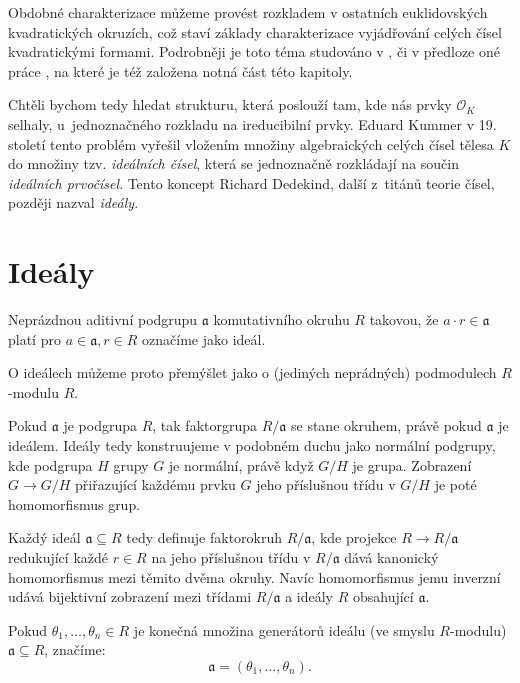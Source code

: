 \documentclass[12pt]{report}
\begin{document}
Obdobné charakterizace můžeme provést rozkladem v ostatních euklidovských kvadratických okruzích, což staví základy charakterizace vyjádřování celých čísel kvadratickými formami. Podrobněji je toto téma studováno v \cite{Tomas}, či v předloze oné práce \cite{Cox}, na které je též založena notná část této kapitoly.

 Chtěli bychom tedy hledat strukturu, která poslouží tam, kde nás prvky $\mathcal{O}_K$ selhaly, u~jednoznačného rozkladu na ireducibilní prvky. Eduard Kummer v 19. století tento problém vyřešil vložením množiny algebraických celých čísel tělesa $K$ do množiny tzv. \textit{ideálních čísel}, která se jednoznačně rozkládají na součin \textit{ideálních prvočísel}. Tento koncept Richard Dedekind, další z~titánů teorie čísel, později nazval \textit{ideály}.

\section{Ideály}

\begin{definice}
Neprázdnou aditivní podgrupu $\mathfrak{a}$ komutativního okruhu $R$ takovou, že $a \cdot r \in \mathfrak{a}$ platí pro $a \in \mathfrak{a}, r \in R$ označíme jako ideál. 
\end{definice}
O ideálech můžeme proto přemýšlet jako o (jediných neprádných) podmodulech $R$-modulu $R$.

Pokud $\mathfrak{a}$ je podgrupa $R$, tak faktorgrupa $R/\mathfrak{a}$ se stane okruhem, právě pokud $\mathfrak{a}$ je ideálem. Ideály tedy konstruujeme v podobném duchu jako normální podgrupy, kde podgrupa $H$ grupy $G$ je normální, právě když $G/H$ je grupa. Zobrazení $G \longrightarrow G/H$ přiřazující každému prvku $G$ jeho příslušnou třídu v $G/H$ je poté homomorfismus grup.

Každý ideál $\mathfrak{a} \subseteq R$ tedy definuje faktorokruh $R/\mathfrak{a}$, kde projekce $R \longrightarrow R/\mathfrak{a}$ redukující každé $r \in R$ na jeho příslušnou třídu v $R/\mathfrak{a}$ dává kanonický homomorfismus mezi těmito dvěma okruhy. Navíc homomorfismus jemu inverzní udává bijektivní zobrazení mezi třídami $R/\mathfrak{a}$ a ideály $R$ obsahující $\mathfrak{a}$.

\begin{definice}
Pokud $\theta_1,\dots,\theta_n \in R$ je konečná množina generátorů ideálu (ve smyslu $R$-modulu) $\mathfrak{a} \subseteq R$, značíme:
\begin{equation*}
\mathfrak{a} = (\theta_1,\dots,\theta_n).
\end{equation*}
\end{definice}
\end{document}
